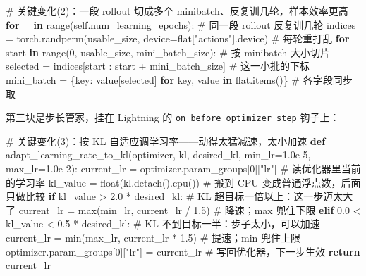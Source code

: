 \documentclass[
  chinese,
]{ctexart}
\newenvironment{Shaded}{\begin{snugshade}}{\end{snugshade}}
\newcommand{\BuiltInTok}[1]{\textcolor[rgb]{0.00,0.23,0.31}{#1}}
\newcommand{\CommentTok}[1]{\textcolor[rgb]{0.37,0.37,0.37}{#1}}
\newcommand{\ControlFlowTok}[1]{\textcolor[rgb]{0.00,0.23,0.31}{\textbf{#1}}}
\newcommand{\DecValTok}[1]{\textcolor[rgb]{0.68,0.00,0.00}{#1}}
\newcommand{\FloatTok}[1]{\textcolor[rgb]{0.68,0.00,0.00}{#1}}
\newcommand{\KeywordTok}[1]{\textcolor[rgb]{0.00,0.23,0.31}{\textbf{#1}}}
\newcommand{\NormalTok}[1]{\textcolor[rgb]{0.00,0.23,0.31}{#1}}
\newcommand{\OperatorTok}[1]{\textcolor[rgb]{0.37,0.37,0.37}{#1}}
\newcommand{\StringTok}[1]{\textcolor[rgb]{0.13,0.47,0.30}{#1}}
\newcommand{\VariableTok}[1]{\textcolor[rgb]{0.07,0.07,0.07}{#1}}
\begin{document}
\begin{Shaded}
\begin{Highlighting}[]
\CommentTok{\# 关键变化(2)：一段 rollout 切成多个 minibatch、反复训几轮，样本效率更高}
        \ControlFlowTok{for}\NormalTok{ \_ }\KeywordTok{in} \BuiltInTok{range}\NormalTok{(}\VariableTok{self}\NormalTok{.num\_learning\_epochs):    }\CommentTok{\# 同一段 rollout 反复训几轮}
\NormalTok{            indices }\OperatorTok{=}\NormalTok{ torch.randperm(usable\_size, device}\OperatorTok{=}\NormalTok{flat[}\StringTok{"actions"}\NormalTok{].device)    }\CommentTok{\# 每轮重打乱}
            \ControlFlowTok{for}\NormalTok{ start }\KeywordTok{in} \BuiltInTok{range}\NormalTok{(}\DecValTok{0}\NormalTok{, usable\_size, mini\_batch\_size):    }\CommentTok{\# 按 minibatch 大小切片}
\NormalTok{                selected }\OperatorTok{=}\NormalTok{ indices[start : start }\OperatorTok{+}\NormalTok{ mini\_batch\_size]    }\CommentTok{\# 这一小批的下标}
\NormalTok{                mini\_batch }\OperatorTok{=}\NormalTok{ \{key: value[selected] }\ControlFlowTok{for}\NormalTok{ key, value }\KeywordTok{in}\NormalTok{ flat.items()\}    }\CommentTok{\# 各字段同步取}
\end{Highlighting}
\end{Shaded}

第三块是步长管家，挂在 Lightning 的 \texttt{on\_before\_optimizer\_step}
钩子上：

\begin{Shaded}
\begin{Highlighting}[]
\CommentTok{\# 关键变化(3)：按 KL 自适应调学习率——动得太猛减速，太小加速}
\KeywordTok{def}\NormalTok{ adapt\_learning\_rate\_to\_kl(optimizer, kl, desired\_kl, min\_lr}\OperatorTok{=}\FloatTok{1.0e{-}5}\NormalTok{, max\_lr}\OperatorTok{=}\FloatTok{1.0e{-}2}\NormalTok{):}
\NormalTok{    current\_lr }\OperatorTok{=}\NormalTok{ optimizer.param\_groups[}\DecValTok{0}\NormalTok{][}\StringTok{"lr"}\NormalTok{]    }\CommentTok{\# 读优化器里当前的学习率}
\NormalTok{    kl\_value }\OperatorTok{=} \BuiltInTok{float}\NormalTok{(kl.detach().cpu())    }\CommentTok{\# 搬到 CPU 变成普通浮点数，后面只做比较}
    \ControlFlowTok{if}\NormalTok{ kl\_value }\OperatorTok{\textgreater{}} \FloatTok{2.0} \OperatorTok{*}\NormalTok{ desired\_kl:    }\CommentTok{\# KL 超目标一倍以上：这一步迈太大了}
\NormalTok{        current\_lr }\OperatorTok{=} \BuiltInTok{max}\NormalTok{(min\_lr, current\_lr }\OperatorTok{/} \FloatTok{1.5}\NormalTok{)    }\CommentTok{\# 降速；max 兜住下限}
    \ControlFlowTok{elif} \FloatTok{0.0} \OperatorTok{\textless{}}\NormalTok{ kl\_value }\OperatorTok{\textless{}} \FloatTok{0.5} \OperatorTok{*}\NormalTok{ desired\_kl:    }\CommentTok{\# KL 不到目标一半：步子太小，可以加速}
\NormalTok{        current\_lr }\OperatorTok{=} \BuiltInTok{min}\NormalTok{(max\_lr, current\_lr }\OperatorTok{*} \FloatTok{1.5}\NormalTok{)    }\CommentTok{\# 提速；min 兜住上限}
\NormalTok{    optimizer.param\_groups[}\DecValTok{0}\NormalTok{][}\StringTok{"lr"}\NormalTok{] }\OperatorTok{=}\NormalTok{ current\_lr    }\CommentTok{\# 写回优化器，下一步生效}
    \ControlFlowTok{return}\NormalTok{ current\_lr}
\end{Highlighting}
\end{Shaded}
\end{document}
